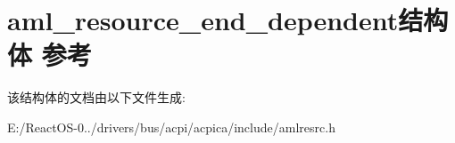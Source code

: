 \hypertarget{structaml__resource__end__dependent}{}\section{aml\+\_\+resource\+\_\+end\+\_\+dependent结构体 参考}
\label{structaml__resource__end__dependent}


该结构体的文档由以下文件生成\+:\begin{DoxyCompactItemize}
\item 
E\+:/\+React\+O\+S-\/0../drivers/bus/acpi/acpica/include/amlresrc.\+h\end{DoxyCompactItemize}
